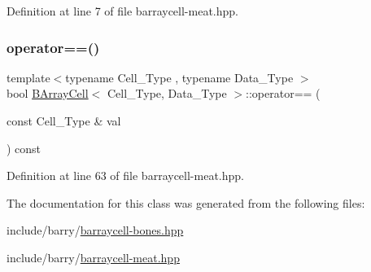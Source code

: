 Definition at line 7 of file barraycell-\/meat.\+hpp.

\mbox{\label{class_b_array_cell_a8d28c5b68b442ddf94cb99d8bc2f9cb9}} 
\subsubsection{\texorpdfstring{operator==()}{operator==()}}
{\footnotesize\ttfamily template$<$typename Cell\+\_\+\+Type , typename Data\+\_\+\+Type $>$ \\
bool \hyperlink{class_b_array_cell}{B\+Array\+Cell}$<$ Cell\+\_\+\+Type, Data\+\_\+\+Type $>$\+::operator== (\begin{DoxyParamCaption}\item[{const Cell\+\_\+\+Type \&}]{val }\end{DoxyParamCaption}) const\hspace{0.3cm}{\ttfamily [inline]}}



Definition at line 63 of file barraycell-\/meat.\+hpp.



The documentation for this class was generated from the following files\+:\begin{DoxyCompactItemize}
\item 
include/barry/\hyperlink{barraycell-bones_8hpp}{barraycell-\/bones.\+hpp}\item 
include/barry/\hyperlink{barraycell-meat_8hpp}{barraycell-\/meat.\+hpp}\end{DoxyCompactItemize}
